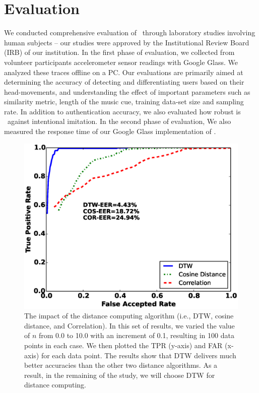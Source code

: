 \section{Evaluation}\label{sec:results}

We conducted comprehensive evaluation of \systemname~through laboratory studies involving
human subjects -- our studies were approved by the Institutional Review Board (IRB) of our
institution. In the first phase of evaluation, we collected from volunteer participants accelerometer sensor
readings with Google Glass. We analyzed these traces offline on a PC.
Our evaluations are primarily aimed at determining the accuracy of detecting
and differentiating users based on their head-movements, and understanding
the effect of important parameters such as similarity metric, length of the music cue, training
data-set size and sampling rate. In addition to authentication accuracy, we also evaluated how robust is \systemname~against intentional imitation.
In the second phase of evaluation, We also measured the response time of our Google
Glass implementation of \systemname.


\begin{figure}\centering
\includegraphics[width=.75\columnwidth]{figure/roc_dtw_cos_cor.eps}
\caption{\label{fig:roc_dtw_cos_cor} The impact of the distance computing algorithm (i.e., DTW, cosine distance, and Correlation). In this set of results, we varied the value of $n$ from 0.0 to 10.0 with an increment of 0.1, resulting in 100 data points in each case. We then plotted the TPR (y-axis) and FAR (x-axis) for each data point. The results show that DTW delivers much better accuracies than the other two distance algorithms. As a result, in the remaining of the study, we will choose DTW for distance computing.}
\end{figure}


